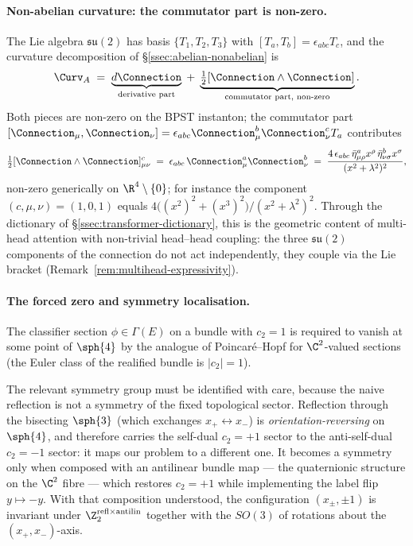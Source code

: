 \paragraph{Non-abelian curvature: the commutator part is non-zero.}
The Lie algebra $\mathfrak{su}(2)$ has basis $\{T_1,T_2,T_3\}$ with
$[T_a,T_b]=\epsilon_{abc}T_c$, and the curvature decomposition of
\S\ref{ssec:abelian-nonabelian} is
\[
   \Curv_A \;=\; \underbrace{d\Connection}_{\text{derivative part}}
   \;+\;\underbrace{\tfrac12[\Connection\wedge\Connection]}_{\text{commutator part, non-zero}}.
\]
Both pieces are non-zero on the BPST instanton; the commutator part
$[\Connection_\mu,\Connection_\nu]=\epsilon_{abc}\Connection^b_\mu
\Connection^c_\nu T_a$ contributes
\[
   \tfrac12[\Connection\wedge\Connection]^{c}_{\mu\nu}
   \;=\; \epsilon_{abc}\,\Connection^{a}_{\mu}\Connection^{b}_{\nu}
   \;=\; \frac{4\,\epsilon_{abc}\,
   \bar\eta^{a}_{\mu\rho}x^{\rho}\,
   \bar\eta^{b}_{\nu\sigma}x^{\sigma}}{(x^2+\lambda^2)^2},
\]
non-zero generically on $\R^4\setminus\{0\}$; for instance the
component $(c,\mu,\nu)=(1,0,1)$ equals
$4\bigl((x^2)^2+(x^3)^2\bigr)/(x^2+\lambda^2)^2$. Through the dictionary
of \S\ref{ssec:transformer-dictionary}, this is the geometric content
of multi-head attention with non-trivial head--head coupling: the
three $\mathfrak{su}(2)$ components of the connection do not act
independently, they couple via the Lie bracket
(Remark~\ref{rem:multihead-expressivity}).

\paragraph{The forced zero and symmetry localisation.} The
classifier section $\phi\in\Gamma(E)$ on a bundle with $c_2=1$ is
required to vanish at some point of $\sph{4}$ by the analogue of
Poincar\'e--Hopf for $\C^2$-valued sections (the Euler class of the
realified bundle is $|c_2|=1$).

The relevant symmetry group must be identified with care, because
the naive reflection is not a symmetry of the fixed topological
sector. Reflection through the bisecting $\sph{3}$ (which exchanges
$x_+\leftrightarrow x_-$) is \emph{orientation-reversing} on
$\sph{4}$, and therefore carries the self-dual $c_2=+1$ sector to
the anti-self-dual $c_2=-1$ sector: it maps our problem to a
different one. It becomes a symmetry only when composed with an
antilinear bundle map --- the quaternionic structure on the $\C^2$
fibre --- which restores $c_2=+1$ while implementing the label flip
$y\mapsto -y$. With that composition understood, the configuration
$(x_\pm,\pm1)$ is invariant under
$\Z_2^{\mathrm{refl}\times\mathrm{antilin}}$ together with the
$SO(3)$ of rotations about the $(x_+,x_-)$-axis.

